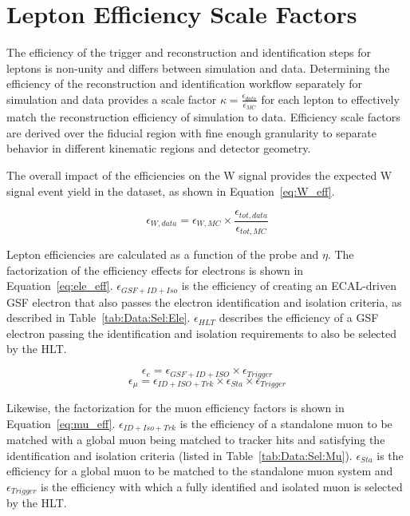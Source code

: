 \chapter{Lepton Efficiency Scale Factors}\label{ch:eff}
The efficiency of the trigger and reconstruction and identification steps for leptons is non-unity and differs between simulation and data. Determining the efficiency of the reconstruction and identification workflow separately for simulation and data provides a scale factor $\kappa = \frac{\epsilon_{data}}{\epsilon_{MC}}$ for each lepton to effectively match the reconstruction efficiency of simulation to data. Efficiency scale factors are derived over the fiducial region with fine enough granularity to separate behavior in different kinematic regions and detector geometry. 

The overall impact of the efficiencies on the W signal provides the expected W signal event yield in the dataset, as shown in Equation~\ref{eq:W_eff}. 

\begin{equation}
  \epsilon_{W,data} = \epsilon_{W,MC}\times\frac{\epsilon_{tot,data}}{\epsilon_{tot,MC}}
  \label{eq:W_eff}
\end{equation}

Lepton efficiencies are calculated as a function of the probe \pt and $\eta$. The factorization of the efficiency effects for electrons is shown in Equation~\ref{eq:ele_eff}. $\epsilon_{GSF+ID+Iso}$ is the efficiency of creating an ECAL-driven GSF electron that also passes the electron identification and isolation criteria, as described in Table~\ref{tab:Data:Sel:Ele}. $\epsilon_{HLT}$ describes the efficiency of a GSF electron passing the identification and isolation requirements to also be selected by the HLT. 

\begin{equation}
  \epsilon_{e} = \epsilon_{GSF+ID+ISO} \times \epsilon_{Trigger}
  \label{eq:ele_eff}
\end{equation}
\begin{equation}
  \epsilon_{\mu} = \epsilon_{ID+ISO+Trk} \times  \epsilon_{Sta} \times \epsilon_{Trigger}
  \label{eq:mu_eff}
\end{equation}

Likewise, the factorization for the muon efficiency factors is shown in Equation~\ref{eq:mu_eff}. $\epsilon_{ID+Iso+Trk}$ is the efficiency of a standalone muon to be matched with a global muon being matched to tracker hits and satisfying the identification and isolation criteria (listed in Table~\ref{tab:Data:Sel:Mu}). $\epsilon_{Sta}$ is the efficiency for a global muon to be matched to the standalone muon system and 
$\epsilon_{Trigger}$ is the efficiency with which a fully identified and isolated muon is selected by the HLT. 


